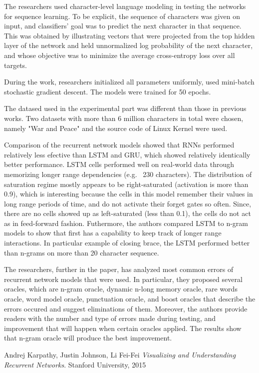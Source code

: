 \documentclass{IEEEtran}
\begin{document}
The researchers used character-level language modeling in testing the networks for sequence learning. To be explicit, the sequence of characters was given on input, and classifiers' goal was to predict the next character in that sequence. This was obtained by illustrating vectors that were projected from the top hidden layer of the network and held unnormalized log probability of the next character, and whose objective was to minimize the average cross-entropy loss over all targets.

During the work, researchers initialized all parameters uniformly, used mini-batch stochastic gradient descent. The models were trained for 50 epochs.

The datased used in the experimental part was different than those in previous works. Two datasets with more than 6 million characters in total were chosen, namely "War and Peace" and the source code of Linux Kernel were used.

Comparison of the recurrent network models showed that RNNs performed relatively less efective than LSTM and GRU, which showed relatively identically better performance. LSTM cells performed well on real-world data through memorizing longer range dependencies (e.g. ~230 characters). The distribution of saturation regime mostly appears to be right-saturated (activation is more than 0.9), which is interesting because the cells in this model remember their values in long range periods of time, and do not activate their forget gates so often. Since, there are no cells showed up as left-saturated (less than 0.1), the cells do not act as in feed-forward fashion. Futhermore, the authors compared LSTM to n-gram models to show that first has a capability to keep track of longer range interactions. In particular example of closing brace, the LSTM performed better than n-grams on more than 20 character sequence.

The researchers, further in the paper, has analyzed most common errors of recurrent network models that were used. In particular, they proposed several oracles, which are n-gram oracle, dynamic n-long memory oracle, rare words oracle, word model oracle, punctuation oracle, and boost oracles that describe the errors occured and suggest eliminations of them. Moreover, the authors provide readers with the number and type of errors made during testing, and improvement that will happen when certain oracles applied. The results show that n-gram oracle will produce the best improvement.

\begin{thebibliography}{1}

\bibitem{}
Andrej Karpathy, Justin Johnson, Li Fei-Fei \emph{Visualizing and Understanding Recurrent Networks}.
Stanford University, 2015

\end{thebibliography}
\end{document}
